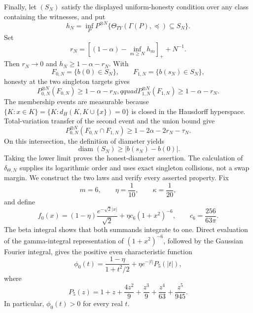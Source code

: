 Finally, let \((S_N)\) satisfy the displayed uniform-honesty condition over any class containing the witnesses, and put
\[
 h_N=\inf_P P^{\otimes N}\{\Theta_{TY}(\Gamma(P),\preceq)\subseteq S_N\}.
\]
Set
\[
 r_N=\left[(1-\alpha)-\inf_{m\ge N}h_m\right]_++N^{-1}.
\]
Then \(r_N\to0\) and \(h_N\ge1-\alpha-r_N\).  With
\[
 F_{0,N}=\{b(0)\in S_N\},\qquad F_{1,N}=\{b(s_N)\in S_N\},
\]
honesty at the two singleton targets gives
\[
 P_{0,N}^{\otimes N}(F_{0,N})\ge1-\alpha-r_N,qquad
 P_{1,N}^{\otimes N}(F_{1,N})\ge1-\alpha-r_N.
\]
The membership events are measurable because \(\{K:x\in K\}=\{K:d_H(K,K\cup\{x\})=0\}\) is closed in the Hausdorff hyperspace.  Total-variation transfer of the second event and the union bound give
\[
 P_{0,N}^{\otimes N}(F_{0,N}\cap F_{1,N})
 \ge1-2\alpha-2r_N-\tau_N.
\]
On this intersection, the definition of diameter yields
\[
 \operatorname{diam}(S_N)\ge|b(s_N)-b(0)|.
\]
Taking the lower limit proves the honest-diameter assertion.  The calculation of \(\delta_{\Theta,N}\) supplies its logarithmic order and uses exact singleton collisions, not a swap margin.
We construct the two laws and verify every asserted property.  Fix
\[
 m=6,\qquad \eta=\frac1{10},\qquad \kappa=\frac1{20},
\]
and define
\[
 f_0(x)=(1-\eta)\frac{e^{-\sqrt2|x|}}{\sqrt2}
       +\eta c_6(1+x^2)^{-6},
 \qquad c_6=\frac{256}{63\pi}.
\]
The beta integral shows that both summands integrate to one.  Direct evaluation of the gamma-integral representation of \((1+x^2)^{-6}\), followed by the Gaussian Fourier integral, gives the positive even characteristic function
\[
 \phi_0(t)=\frac{1-\eta}{1+t^2/2}+\eta e^{-|t|}P_5(|t|),
\]
where
\[
 P_5(z)=1+z+\frac{4z^2}{9}+\frac{z^3}{9}
       +\frac{z^4}{63}+\frac{z^5}{945}.
\]
In particular, \(\phi_0(t)>0\) for every real \(t\).

